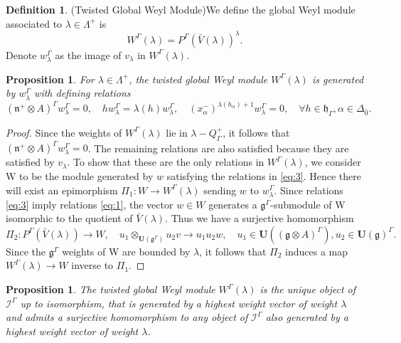 \documentclass[11pt]{amsart}
\theoremstyle{plain}
\newtheorem{prop}[thm]{Proposition}
\theoremstyle{definition}
\newtheorem{defn}[thm]{Definition}
\newcommand{\g}{\mathfrak{g}}
\newcommand{\h}{\mathfrak{h}}
\newcommand{\n}{\mathfrak{n}}
\begin{document}
\begin{defn}(Twisted Global Weyl Module)\label{def:4}
We define the global Weyl module associated to $\lambda\in \Lambda^+$ is 
\begin{equation*}
    W^\Gamma(\lambda)=P^\Gamma(\bar{V}(\lambda))^\lambda.
\end{equation*}
    Denote $w^{\Gamma}_{\lambda}$ as the image of $v_\lambda$ in $W^\Gamma(\lambda)$.
\end{defn}
\begin{prop}\label{prop:1}
    For $\lambda\in \Lambda^+$, the twisted global Weyl module $W^\Gamma(\lambda)$ is generated by $w_{\lambda}^{\Gamma}$ with defining relations
    \begin{equation}\label{eq:3}
        (\n^+\otimes A)^\Gamma w^{\Gamma}_{\lambda}=0, \quad hw^{\Gamma}_{\lambda}=\lambda(h)w^{\Gamma}_{\lambda},\quad (x_{\alpha}^{-})^{\lambda(h_\alpha)+1}w^{\Gamma}_{\lambda}=0, \quad \forall h\in\h_{\Gamma},\alpha\in\Delta_{\bar{0}}.
    \end{equation}
\end{prop}
\begin{proof}
Since the weights of $W^\Gamma(\lambda)$ lie in $\lambda-Q^+_{\Gamma}$, it follows that $(\n^+\otimes A)^\Gamma w^{\Gamma}_{\lambda}=0$. The remaining relations are also satisfied because they are satisfied by $v_\lambda$. To show that these are the only relations in $W^\Gamma(\lambda)$, we consider W to be the module generated by $w$ satisfying the relations in \eqref{eq:3}. Hence there will exist an epimorphism $\Pi_1:W\longrightarrow W^\Gamma(\lambda)$ sending $w$ to $w^{\Gamma}_{\lambda}$. Since relations \eqref{eq:3} imply relations \eqref{eq:1}, the vector $w\in W$ generates a $\g^\Gamma$-submodule of W isomorphic to the quotient of $\bar{V}(\lambda)$. Thus we have a surjective homomorphism 
    \begin{equation*}
        \Pi_2:P^\Gamma(\bar{V}(\lambda))\longrightarrow W, \quad u_1\otimes_{\mathbf{U}(\g^{\Gamma})}u_2v\longrightarrow u_{1}u_{2}w, \quad u_1\in \mathbf{U}((\g\otimes A)^\Gamma), u_2\in \mathbf{U}(\g)^\Gamma.
    \end{equation*}
    Since the $\g^\Gamma$ weights of W are bounded by $\lambda$, it follows that $\Pi_2$ induces a map $W^{\Gamma}(\lambda)\longrightarrow W$ inverse to $\Pi_1$.
\end{proof}
\begin{prop}\label{prop:2}
The twisted global Weyl module $W^\Gamma(\lambda)$ is the unique object of $\mathcal{I}^\Gamma$ up to isomorphism, that is generated by a highest weight vector of weight $\lambda$ and admits a surjective homomorphism to any object of $\mathcal{I}^\Gamma$ also generated by a highest weight vector of weight $\lambda$.
\end{prop}
\end{document}
